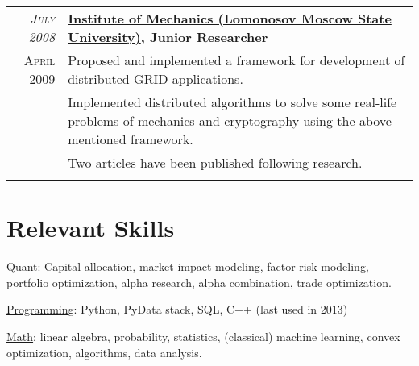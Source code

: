 \documentclass[unicode,a4paper,10pt]{article}
\begin{document}
\begin{tabular}{r p{13cm}}
 \emph{\textsc{July 2008}} & \textbf{\href{http://www.imec.msu.ru/}{Institute of Mechanics (Lomonosov Moscow State University)}, Junior Researcher} \\
\textsc{April 2009}
&\footnotesize{Proposed and implemented a framework for development of distributed GRID applications.}\\
&\footnotesize{Implemented distributed algorithms to solve some real-life problems of mechanics and cryptography using the above mentioned framework.}\\
&\footnotesize{Two articles have been published following research.}\\ 
\multicolumn{2}{c}{} 
\end{tabular}

\section{Relevant Skills}
\underline{Quant}: Capital allocation, market impact modeling, factor risk modeling, portfolio optimization, alpha research, alpha combination, trade optimization.

\underline{Programming}: Python, PyData stack, SQL, C++ (last used in 2013)

\underline{Math}: linear algebra, probability, statistics, (classical) machine learning, convex optimization, algorithms, data analysis.


 
\end{document}

